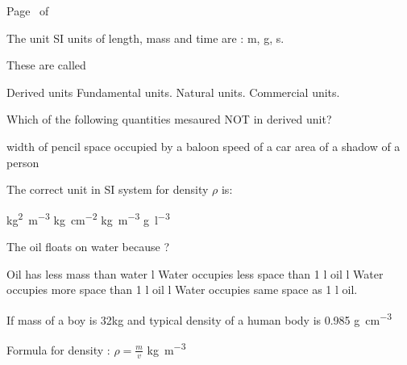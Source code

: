 \documentclass[12pt,addpoints]{exam}
\begin{document}
\pagestyle{headandfoot} \extraheadheight{.25in}
\footer{} {Page \thepage\ of \numpages} {}

\begin{questions}




\myquestion[1] The unit SI units of length, mass and time are :
\unit{\metre}, \unit{\gram}, \unit{\second}.

These are called
	\begin{choices}
	\choice Derived units
	\CorrectChoice Fundamental units.
	\choice Natural units.
	\choice Commercial units.
	\end{choices}


\myquestion[1] Which of the following quantities mesaured NOT in derived unit?

	\begin{choices}
	\correctchoice width of pencil
	\choice space occupied by a baloon
	\choice speed of a car
	\choice area of a shadow of a person
	\end{choices}


\myquestion[1] The correct unit in SI system for density $\rho$ is:

	\begin{choices}
	  \choice \unit{\kg^2\per\metre^3}
	  \choice \unit{\kg\per\centi\metre^2}
	\CorrectChoice \unit{\kg\per\m^3}
	\choice \unit{\g\per\litre^3}
	\end{choices}


\myquestion[1] The oil floats on water because ?
 \begin{choices}
   \choice Oil has less mass than water
    \unit{\l} Water occupies less space than 1 \unit{\l} oil
    \unit{\l} Water occupies more space than 1 \unit{\l} oil
    \unit{\l} Water occupies same space as 1 \unit{\l} oil.
\end{choices}

\myquestion If mass of a boy is 32\unit{\kg} and typical density of a human body is 0.985 \unit{\g\per\cm^3}

Formula for density :  $\rho = \frac{m}{v}$ \unit{\kg\per\m^{3}}
\end{questions}
\end{document}

